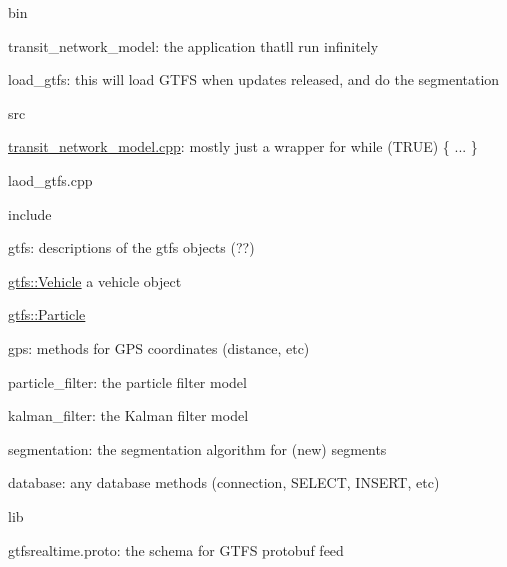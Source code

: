 \begin{DoxyItemize}
\item {\ttfamily bin}
\begin{DoxyItemize}
\item {\ttfamily transit\+\_\+network\+\_\+model}\+: the application that\textquotesingle{}ll run \textquotesingle{}infinitely\textquotesingle{}
\item {\ttfamily load\+\_\+gtfs}\+: this will load G\+T\+FS when updates released, and do the segmentation
\end{DoxyItemize}
\item {\ttfamily src}
\begin{DoxyItemize}
\item {\ttfamily \hyperlink{transit__network__model_8cpp}{transit\+\_\+network\+\_\+model.\+cpp}}\+: mostly just a wrapper for {\ttfamily while (T\+R\+UE) \{ ... \}}
\item {\ttfamily laod\+\_\+gtfs.\+cpp}
\end{DoxyItemize}
\item {\ttfamily include}
\begin{DoxyItemize}
\item {\ttfamily gtfs}\+: descriptions of the gtfs objects (??)
\begin{DoxyItemize}
\item {\ttfamily \hyperlink{classgtfs_1_1Vehicle}{gtfs\+::\+Vehicle}} a vehicle object
\item {\ttfamily \hyperlink{classgtfs_1_1Particle}{gtfs\+::\+Particle}}
\end{DoxyItemize}
\item {\ttfamily gps}\+: methods for G\+PS coordinates (distance, etc)
\item {\ttfamily particle\+\_\+filter}\+: the particle filter model
\item {\ttfamily kalman\+\_\+filter}\+: the Kalman filter model
\item {\ttfamily segmentation}\+: the segmentation algorithm for (new) segments
\item {\ttfamily database}\+: any database methods (connection, S\+E\+L\+E\+CT, I\+N\+S\+E\+RT, etc)
\end{DoxyItemize}
\item {\ttfamily lib}
\begin{DoxyItemize}
\item {\ttfamily gtfsrealtime.\+proto}\+: the schema for G\+T\+FS protobuf feed 
\end{DoxyItemize}
\end{DoxyItemize}
